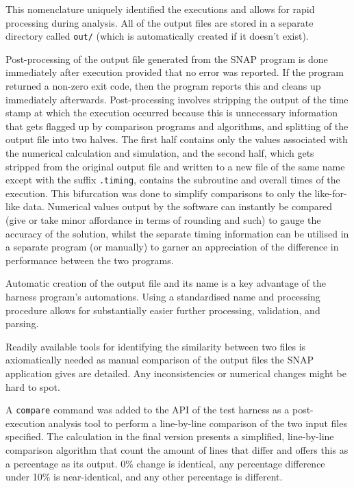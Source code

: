 \documentclass[conference]{IEEEtran}
\begin{document}
This nomenclature uniquely identified the executions and allows for rapid processing during analysis. All of the output files are stored in a separate directory called \texttt{out/} (which is automatically created if it doesn't exist).

Post-processing of the output file generated from the SNAP program is done immediately after execution provided that no error was reported. If the program returned a non-zero exit code, then the program reports this and cleans up immediately afterwards. Post-processing involves stripping the output of the time stamp at which the execution occurred because this is unnecessary information that gets flagged up by comparison programs and algorithms, and splitting of the output file into two halves. The first half contains only the values associated with the numerical calculation and simulation, and the second half, which gets stripped from the original output file and written to a new file of the same name except with the suffix \texttt{.timing}, contains the subroutine and overall times of the execution. This bifurcation was done to simplify comparisons to only the like-for-like data. Numerical values output by the software can instantly be compared (give or take minor affordance in terms of rounding and such) to gauge the accuracy of the solution, whilst the separate timing information can be utilised in a separate program (or manually) to garner an appreciation of the difference in performance between the two programs.

Automatic creation of the output file and its name is a key advantage of the harness program's automations. Using a standardised name and processing procedure allows for substantially easier further processing, validation, and parsing.

Readily available tools for identifying the similarity between two files is axiomatically needed as manual comparison of the output files the SNAP application gives are detailed. Any inconsistencies or numerical changes might be hard to spot.

A \texttt{compare} command was added to the API of the test harness as a post-execution analysis tool to perform a line-by-line comparison of the two input files specified. The calculation in the final version presents a simplified, line-by-line comparison algorithm that count the amount of lines that differ and offers this as a percentage as its output. 0\% change is identical, any percentage difference under 10\% is near-identical, and any other percentage is different.
\end{document}
